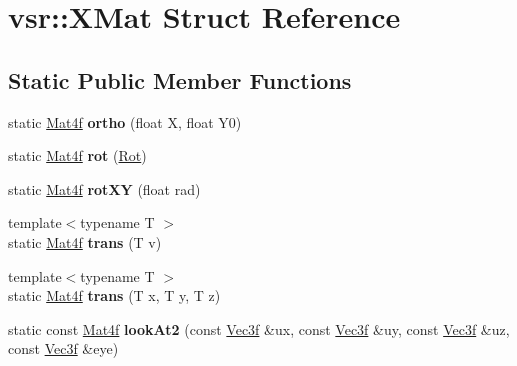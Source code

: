 \hypertarget{structvsr_1_1_x_mat}{\section{vsr\-:\-:X\-Mat Struct Reference}
\label{structvsr_1_1_x_mat}
}
\subsection*{Static Public Member Functions}
\begin{DoxyCompactItemize}
\item 
\hypertarget{structvsr_1_1_x_mat_af23b2179754f7d573be41951ffa248b9}{static \hyperlink{classvsr_1_1_mat4}{Mat4f} {\bfseries ortho} (float X, float Y0)}\label{structvsr_1_1_x_mat_af23b2179754f7d573be41951ffa248b9}

\item 
\hypertarget{structvsr_1_1_x_mat_aa297a3abaae4087527400fb1a5ab8124}{static \hyperlink{classvsr_1_1_mat4}{Mat4f} {\bfseries rot} (\hyperlink{namespacevsr_aa1af5d33b552dd31499209a8f68548e8}{Rot})}\label{structvsr_1_1_x_mat_aa297a3abaae4087527400fb1a5ab8124}

\item 
\hypertarget{structvsr_1_1_x_mat_af8350a3940d2ef9c30884fe954e6e056}{static \hyperlink{classvsr_1_1_mat4}{Mat4f} {\bfseries rot\-X\-Y} (float rad)}\label{structvsr_1_1_x_mat_af8350a3940d2ef9c30884fe954e6e056}

\item 
\hypertarget{structvsr_1_1_x_mat_a35b2ca81153cd5d48c72401177bbeebe}{{\footnotesize template$<$typename T $>$ }\\static \hyperlink{classvsr_1_1_mat4}{Mat4f} {\bfseries trans} (T v)}\label{structvsr_1_1_x_mat_a35b2ca81153cd5d48c72401177bbeebe}

\item 
\hypertarget{structvsr_1_1_x_mat_a5046fcb435362e2247a1309e330507e2}{{\footnotesize template$<$typename T $>$ }\\static \hyperlink{classvsr_1_1_mat4}{Mat4f} {\bfseries trans} (T x, T y, T z)}\label{structvsr_1_1_x_mat_a5046fcb435362e2247a1309e330507e2}

\item 
\hypertarget{structvsr_1_1_x_mat_a723302dbfe0c2e2c5f4b3dcaf3511b9a}{static const \hyperlink{classvsr_1_1_mat4}{Mat4f} {\bfseries look\-At2} (const \hyperlink{classvsr_1_1_vec3}{Vec3f} \&ux, const \hyperlink{classvsr_1_1_vec3}{Vec3f} \&uy, const \hyperlink{classvsr_1_1_vec3}{Vec3f} \&uz, const \hyperlink{classvsr_1_1_vec3}{Vec3f} \&eye)}\label{structvsr_1_1_x_mat_a723302dbfe0c2e2c5f4b3dcaf3511b9a}


\end{DoxyCompactItemize}
